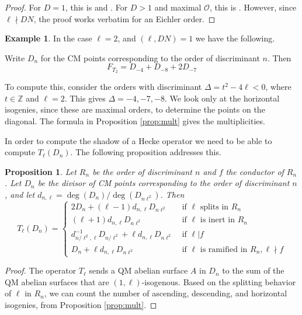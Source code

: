 \documentclass[12pt]{amsart}
\newcommand{\Z}{\mathbb{Z}}
\newcommand{\calO}{\mathcal{O}}
\newcommand{\notdiv}{\nmid}
\numberwithin{equation}{subsection}
\theoremstyle{plain}\newtheorem{ithm}{Theorem}
\theoremstyle{plain}\newtheorem{iprop}[ithm]{Proposition}
\newtheorem{proposition}[equation]{Proposition}
\theoremstyle{definition}
\newtheorem{example}[equation]{Example}
\theoremstyle{remark}
\newcommand{\Order}{\calO} %
\newcommand{\reldeg}[2]{d_{{#1}, {#2}}}
\begin{document}
\begin{proof}
For $D = 1$, this is \cite[\S 2.9, Lemma 6, Remark 8]{Sutherland} and \cite[Proposition 23]{Kohel}. 
For $D > 1$ and maximal $\Order$, this is \cite[Lemma 4.2, Lemma 4.3]{Saia}. However, since $\ell \nmid DN$, the proof works verbatim for an Eichler order.
\end{proof}


\begin{example}
In the case $\ell = 2$, and $(\ell, DN) = 1$  we have the following.

Write $D_n$ for the CM points corresponding to the order of discriminant $n$. Then 
\begin{equation}
\label{eq:FT2} F_{T_2} =   D_{-4} + D_{-8} + 2D_{-7}
\end{equation}

To compute this, consider the orders with discriminant $\Delta = t^2 - 4 \ell < 0$, where $t \in \Z$ and $\ell = 2$. This gives $\Delta = -4, -7, -8$.
 We look only at the horizontal isogenies, since these are maximal orders, to determine the points on the diagonal. The formula in Proposition \ref{prop:mult} gives the multiplicities.
\end{example}


In order to compute the shadow of a Hecke operator we need to be able to compute $T_\ell(D_{n})$. The following proposition addresses this.

\begin{proposition}
\label{prop:isogenies}
Let $R_n$ be the order of discriminant $n$ and $f$ the conductor of $R_n$. Let $D_n$ be  the divisor of CM points corresponding to the order of discriminant $n$, and let $\reldeg{n}{\ell} = \deg(D_n) / \deg(D_{n\ell^2})$. Then
\[ T_\ell(D_{n}) =  \begin{cases} 
2 D_n + (\ell - 1) \reldeg{n}{\ell} D_{n \ell^2} & \text{ if } \ell \text{ splits in } R_n\\
(\ell + 1) \reldeg{n}{\ell} D_{n \ell^2} & \text{ if } \ell \text{ is inert in } R_n \\
 \reldeg{n/\ell^2}{\ell}^{-1} D_{n/\ell^2} +  \ell \reldeg{n}{\ell} D_{n \ell^2} & \text{ if } \ell | f \\
  D_{n} +  \ell \reldeg{n}{\ell}   D_{n \ell^2} & \text{ if } \ell \text{ is ramified in } R_n, \ell \notdiv f 
\end{cases} \]
\end{proposition}
\begin{proof}
The operator $T_\ell$ sends a QM abelian surface $A$ in $D_n$ to the sum of the QM abelian surfaces that are $(1,\ell)$-isogenous. Based on the splitting behavior of $\ell$ in $R_n$, we can count the number of ascending,  descending, and  horizontal isogenies, from Proposition \ref{prop:mult}.
\end{proof}
\end{document}

